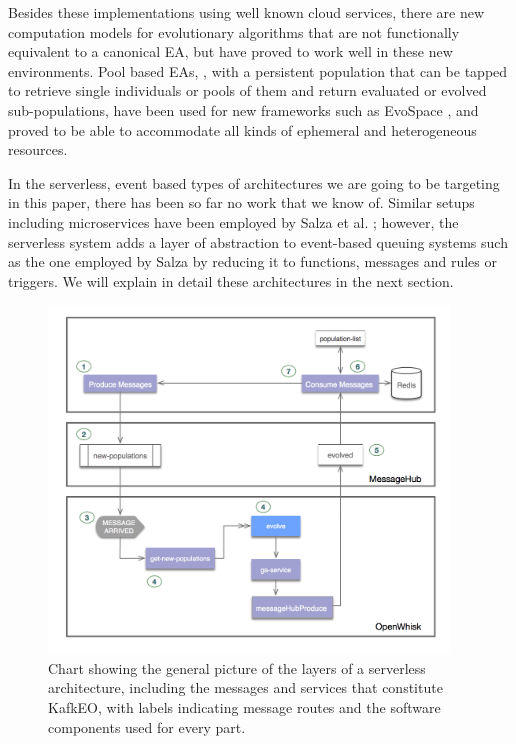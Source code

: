 \documentclass[sigconf]{acmart}
\begin{document}
Besides these implementations using well known cloud services, there are new computation models for evolutionary algorithms
that are not functionally equivalent to a canonical EA, but have
proved to work well in these new environments. Pool based EAs,
\cite{bollini1999distributed}, with a persistent population that can
be tapped to retrieve single individuals or pools of them and return
evaluated or evolved sub-populations, have been used for new
frameworks such as EvoSpace \cite{García-Valdez2015}, and proved to be
able to accommodate all kinds of ephemeral and heterogeneous
resources.

In the serverless, event based types of architectures we are going to
be targeting in this paper, there has been so far no work that we know
of. Similar setups including microservices have been employed by Salza et
al. \cite{salza2017ccube}; however, the serverless system adds a layer
of abstraction to event-based queuing systems such as the one employed
by Salza by reducing it to functions, messages and rules or
triggers. We will explain in detail these architectures in the next
section.

\begin{figure}[t!bp]
\includegraphics[width=0.95\textwidth]{img/kafka.png}
\caption{Chart showing the general picture of the layers of a
  serverless architecture, including the messages and services that
  constitute KafkEO, with labels indicating message
  routes and the software components used for every part.}
\label{fig:kafkeo}
\end{figure}
%
\end{document}
